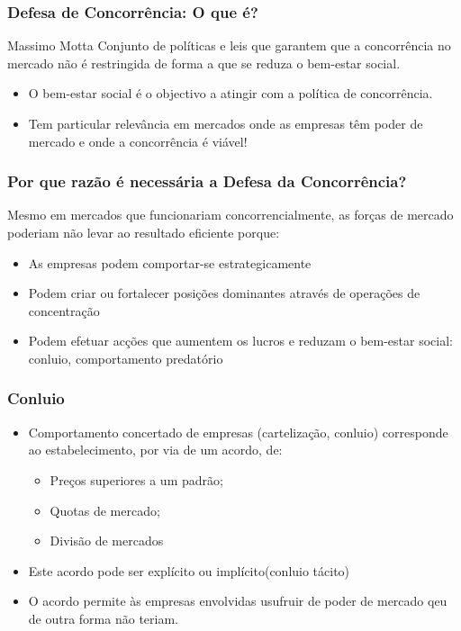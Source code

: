 \begin{frame}
	\frametitle{Defesa de Concorr\^encia: O que \'e?}
	\begin{aquote}{Massimo Motta}
		Conjunto de pol\'iticas e leis que garantem que a concorr\^encia no mercado n\~ao \'e restringida de forma a que se reduza o bem-estar social.
	\end{aquote}
	
	\vspace{0.5cm}

	\begin{itemize}
		\item O bem-estar social \'e o objectivo a atingir com a pol\'itica de concorr\^encia.
		\item Tem particular relev\^ancia em mercados onde as empresas t\^em poder de mercado e onde a concorr\^encia \'e vi\'avel!
	\end{itemize}
\end{frame}

\begin{frame}
	\frametitle{Por que raz\~ao \'e necess\'aria a Defesa da Concorr\^encia?}
	Mesmo em mercados que funcionariam concorrencialmente, as for\c cas de mercado poderiam n\~ao levar ao resultado eficiente porque:
	\begin{itemize}
		\item As empresas podem comportar-se estrategicamente
		\item Podem criar ou fortalecer posi\c c\~oes dominantes atrav\'es de opera\c c\~oes de concentra\c c\~ao
		\item Podem efetuar ac\c c\~oes que aumentem os lucros e reduzam o bem-estar social: conluio, comportamento predat\'orio
	\end{itemize}
\end{frame}

\begin{frame}
	\frametitle{Conluio}
	\begin{itemize}
		\item Comportamento concertado de empresas (carteliza\c c\~ao, conluio) corresponde ao estabelecimento, por via de um acordo, de:
		\begin{itemize}
			\item Pre\c cos superiores a um padr\~ao;
			\item Quotas de mercado;
			\item Divis\~ao de mercados
		\end{itemize}
		\item Este acordo pode ser expl\'icito ou impl\'icito(conluio t\'acito)
		\item O acordo permite \`as empresas envolvidas usufruir de poder de mercado qeu de outra forma n\~ao teriam.
	\end{itemize}
\end{frame}

